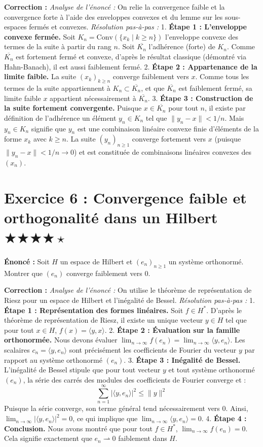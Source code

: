 \documentclass[11pt,a4paper]{article}
\begin{document}
\textbf{Correction :}
\textit{Analyse de l'énoncé :} On relie la convergence faible et la convergence forte à l'aide des enveloppes convexes et du lemme sur les sous-espaces fermés et convexes.
\textit{Résolution pas-à-pas :}
1. \textbf{Étape 1 : L'enveloppe convexe fermée.}
   Soit $K_n = \text{Conv}(\{ x_k \mid k \ge n \})$ l'enveloppe convexe des termes de la suite à partir du rang $n$.
   Soit $\overline{K_n}$ l'adhérence (forte) de $K_n$.
   Comme $\overline{K_n}$ est fortement fermé et convexe, d'après le résultat classique (démontré via Hahn-Banach), il est aussi faiblement fermé.
2. \textbf{Étape 2 : Appartenance de la limite faible.}
   La suite $(x_k)_{k \ge n}$ converge faiblement vers $x$.
   Comme tous les termes de la suite appartiennent à $K_n \subset \overline{K_n}$, et que $\overline{K_n}$ est faiblement fermé, sa limite faible $x$ appartient nécessairement à $\overline{K_n}$.
3. \textbf{Étape 3 : Construction de la suite fortement convergente.}
   Puisque $x \in \overline{K_n}$ pour tout $n$, il existe par définition de l'adhérence un élément $y_n \in K_n$ tel que $\|y_n - x\| < 1/n$.
   Mais $y_n \in K_n$ signifie que $y_n$ est une combinaison linéaire convexe finie d'éléments de la forme $x_k$ avec $k \ge n$.
   La suite $(y_n)_{n \ge 1}$ converge fortement vers $x$ (puisque $\|y_n - x\| < 1/n \to 0$) et est constituée de combinaisons linéaires convexes des $(x_n)$.


\section{Exercice 6 : Convergence faible et orthogonalité dans un Hilbert \quad $\bigstar\bigstar\bigstar\bigstar\star$}

\textbf{Énoncé :}
Soit $H$ un espace de Hilbert et $(e_n)_{n \ge 1}$ un système orthonormé. Montrer que $(e_n)$ converge faiblement vers $0$.

\textbf{Correction :}
\textit{Analyse de l'énoncé :} On utilise le théorème de représentation de Riesz pour un espace de Hilbert et l'inégalité de Bessel.
\textit{Résolution pas-à-pas :}
1. \textbf{Étape 1 : Représentation des formes linéaires.}
   Soit $f \in H^*$. D'après le théorème de représentation de Riesz, il existe un unique vecteur $y \in H$ tel que pour tout $x \in H$, $f(x) = \langle y, x \rangle$.
2. \textbf{Étape 2 : Évaluation sur la famille orthonormée.}
   Nous devons évaluer $\lim_{n \to \infty} f(e_n) = \lim_{n \to \infty} \langle y, e_n \rangle$.
   Les scalaires $c_n = \langle y, e_n \rangle$ sont précisément les coefficients de Fourier du vecteur $y$ par rapport au système orthonormé $(e_n)$.
3. \textbf{Étape 3 : Inégalité de Bessel.}
   L'inégalité de Bessel stipule que pour tout vecteur $y$ et tout système orthonormé $(e_n)$, la série des carrés des modules des coefficients de Fourier converge et :
   $$\sum_{n=1}^\infty |\langle y, e_n \rangle|^2 \le \|y\|^2$$
   Puisque la série converge, son terme général tend nécessairement vers 0.
   Ainsi, $\lim_{n \to \infty} |\langle y, e_n \rangle|^2 = 0$, ce qui implique que $\lim_{n \to \infty} \langle y, e_n \rangle = 0$.
4. \textbf{Étape 4 : Conclusion.}
   Nous avons montré que pour tout $f \in H^*$, $\lim_{n \to \infty} f(e_n) = 0$.
   Cela signifie exactement que $e_n \rightharpoonup 0$ faiblement dans $H$.
\end{document}
